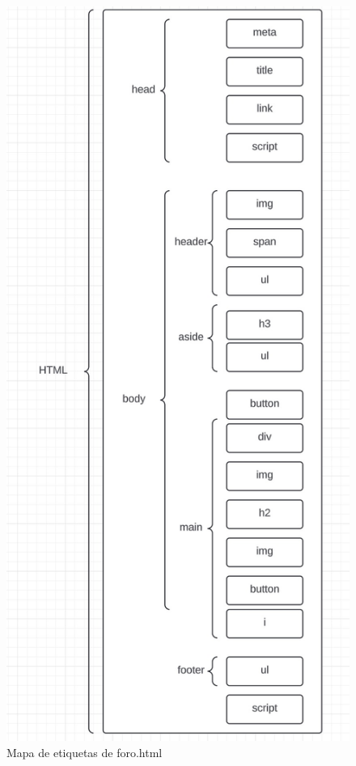 \documentclass{article}
\begin{document}
\begin{figure}[H]
    \centering
    \includegraphics[width=\textwidth, height=0.8\textheight, keepaspectratio]{htmlFotos/MEforo.jpg}
    \caption{Mapa de etiquetas de foro.html}
    \label{fig:mapa_etiquetas_foro}
\end{figure}
\end{document}
